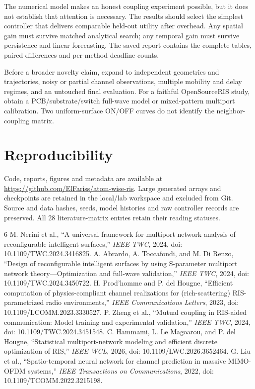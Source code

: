 \documentclass[conference]{IEEEtran}
\begin{document}
The numerical model makes an honest coupling experiment possible, but it does not establish that attention is necessary. The results should select the simplest controller that delivers comparable held-out utility after overhead. Any spatial gain must survive matched analytical search; any temporal gain must survive persistence and linear forecasting. The saved report contains the complete tables, paired differences and per-method deadline counts.

Before a broader novelty claim, expand to independent geometries and trajectories, noisy or partial channel observations, multiple mobility and delay regimes, and an untouched final evaluation. For a faithful OpenSourceRIS study, obtain a PCB/substrate/switch full-wave model or mixed-pattern multiport calibration. Two uniform-surface ON/OFF curves do not identify the neighbor-coupling matrix.

\section*{Reproducibility}
Code, reports, figures and metadata are available at \url{https://github.com/ElFariss/atom-wise-ris}. Large generated arrays and checkpoints are retained in the local/lab workspace and excluded from Git. Source and data hashes, seeds, model histories and raw controller records are preserved. All 28 literature-matrix entries retain their reading statuses.

\begin{thebibliography}{6}
 M. Nerini et al., ``A universal framework for multiport network analysis of reconfigurable intelligent surfaces,'' \emph{IEEE TWC}, 2024, doi: 10.1109/TWC.2024.3416825.
 A. Abrardo, A. Toccafondi, and M. Di Renzo, ``Design of reconfigurable intelligent surfaces by using S-parameter multiport network theory---Optimization and full-wave validation,'' \emph{IEEE TWC}, 2024, doi: 10.1109/TWC.2024.3450722.
 H. Prod'homme and P. del Hougne, ``Efficient computation of physics-compliant channel realizations for (rich-scattering) RIS-parametrized radio environments,'' \emph{IEEE Communications Letters}, 2023, doi: 10.1109/LCOMM.2023.3330527.
 P. Zheng et al., ``Mutual coupling in RIS-aided communication: Model training and experimental validation,'' \emph{IEEE TWC}, 2024, doi: 10.1109/TWC.2024.3451548.
 C. Hammami, L. Le Magoarou, and P. del Hougne, ``Statistical multiport-network modeling and efficient discrete optimization of RIS,'' \emph{IEEE WCL}, 2026, doi: 10.1109/LWC.2026.3652464.
 G. Liu et al., ``Spatio-temporal neural network for channel prediction in massive MIMO-OFDM systems,'' \emph{IEEE Transactions on Communications}, 2022, doi: 10.1109/TCOMM.2022.3215198.
\end{thebibliography}
\end{document}
